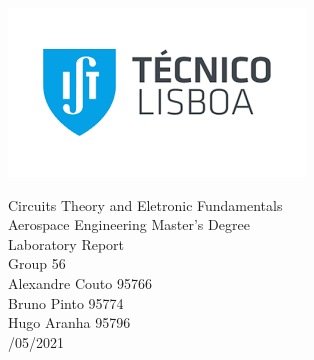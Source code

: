 
\thispagestyle {empty}

\includegraphics[bb=-2.5cm 5cm 0cm 0cm,scale=1.00]{../figlib/index.png}

\begin{center}
%
\vspace{3.0cm}

\vspace{1cm}
{\FontLb Circuits Theory and Eletronic Fundamentals} \\ %
\vspace{1cm}
{\FontSn Aerospace Engineering Master's Degree} \\ %
\vspace{1cm}
{\FontSn Laboratory  Report } \\
\vspace{1cm}
{\FontSn Group 56 } \\
\vspace{1cm}
{\FontSn Alexandre Couto 95766} \\
\vspace{0.1cm}
{\FontSn Bruno Pinto     95774} \\
\vspace{0.1cm}
{\FontSn Hugo Aranha     95796} \\
\vspace{0.5cm}
{/05/2021} \\ %
%
\end{center}


